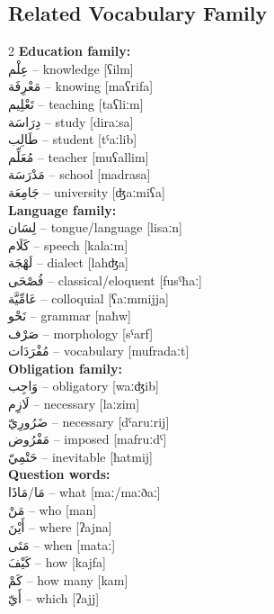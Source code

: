 \documentclass[letterpaper,12pt]{article}
\begin{document}
\subsection{Related Vocabulary Family}

\begin{multicols}{2}
\textbf{Education family:}\\
\textarabic{عِلْم} – knowledge [ʕilm]\\
\textarabic{مَعْرِفَة} – knowing [maʕrifa]\\
\textarabic{تَعْلِيم} – teaching [taʕliːm]\\
\textarabic{دِرَاسَة} – study [diraːsa]\\
\textarabic{طَالِب} – student [tˤaːlib]\\
\textarabic{مُعَلِّم} – teacher [muʕallim]\\
\textarabic{مَدْرَسَة} – school [madrasa]\\
\textarabic{جَامِعَة} – university [ʤaːmiʕa]\\

\textbf{Language family:}\\
\textarabic{لِسَان} – tongue/language [lisaːn]\\
\textarabic{كَلَام} – speech [kalaːm]\\
\textarabic{لَهْجَة} – dialect [lahʤa]\\
\textarabic{فُصْحَى} – classical/eloquent [fusˤħaː]\\
\textarabic{عَامِّيَّة} – colloquial [ʕaːmmijja]\\
\textarabic{نَحْو} – grammar [naħw]\\
\textarabic{صَرْف} – morphology [sˤarf]\\
\textarabic{مُفْرَدَات} – vocabulary [mufradaːt]\\

\textbf{Obligation family:}\\
\textarabic{وَاجِب} – obligatory [waːʤib]\\
\textarabic{لَازِم} – necessary [laːzim]\\
\textarabic{ضَرُورِيّ} – necessary [dˤaruːrij]\\
\textarabic{مَفْرُوض} – imposed [mafruːdˤ]\\
\textarabic{حَتْمِيّ} – inevitable [ħatmij]\\

\textbf{Question words:}\\
\textarabic{مَا/مَاذَا} – what [maː/maːðaː]\\
\textarabic{مَنْ} – who [man]\\
\textarabic{أَيْنَ} – where [ʔajna]\\
\textarabic{مَتَى} – when [mataː]\\
\textarabic{كَيْفَ} – how [kajfa]\\
\textarabic{كَمْ} – how many [kam]\\
\textarabic{أَيّ} – which [ʔajj]\\
\end{multicols}
\end{document}
